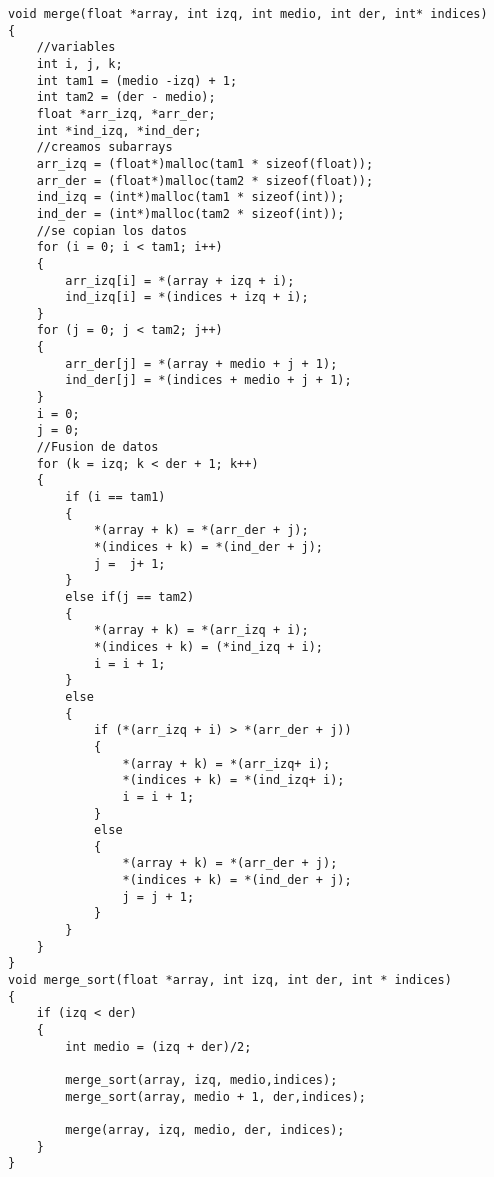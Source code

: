 \begin{lstlisting}
void merge(float *array, int izq, int medio, int der, int* indices)
{
    //variables
    int i, j, k;
    int tam1 = (medio -izq) + 1;
    int tam2 = (der - medio);
    float *arr_izq, *arr_der;
    int *ind_izq, *ind_der;
    //creamos subarrays
    arr_izq = (float*)malloc(tam1 * sizeof(float));
    arr_der = (float*)malloc(tam2 * sizeof(float));
    ind_izq = (int*)malloc(tam1 * sizeof(int));
    ind_der = (int*)malloc(tam2 * sizeof(int));
    //se copian los datos
    for (i = 0; i < tam1; i++)
    {
        arr_izq[i] = *(array + izq + i);
        ind_izq[i] = *(indices + izq + i);
    }
    for (j = 0; j < tam2; j++)
    {
        arr_der[j] = *(array + medio + j + 1);
        ind_der[j] = *(indices + medio + j + 1);
    }
    i = 0;
    j = 0;
    //Fusion de datos
    for (k = izq; k < der + 1; k++)
    {
        if (i == tam1)
        {
            *(array + k) = *(arr_der + j);
            *(indices + k) = *(ind_der + j);
            j =  j+ 1;
        }
        else if(j == tam2)
        {
            *(array + k) = *(arr_izq + i);
            *(indices + k) = (*ind_izq + i);
            i = i + 1;
        }
        else
        {
            if (*(arr_izq + i) > *(arr_der + j))
            {
                *(array + k) = *(arr_izq+ i);
                *(indices + k) = *(ind_izq+ i);
                i = i + 1;
            }
            else
            {
                *(array + k) = *(arr_der + j);
                *(indices + k) = *(ind_der + j);
                j = j + 1;
            }
        }
    }
}
void merge_sort(float *array, int izq, int der, int * indices)
{
    if (izq < der)
    {
        int medio = (izq + der)/2;

        merge_sort(array, izq, medio,indices);
        merge_sort(array, medio + 1, der,indices);
        
        merge(array, izq, medio, der, indices);
    }
}
\end{lstlisting}

\vspace{5mm}
